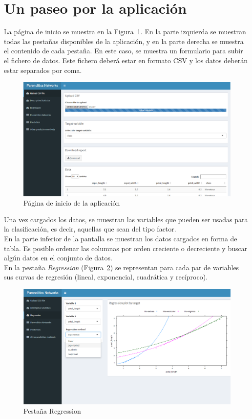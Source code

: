 \section{Un paseo por la aplicación}

La página de inicio se muestra en la Figura~\ref{fig:inicio}. En la parte izquierda se muestran todas las pestañas disponibles de la aplicación, y en la parte derecha se muestra el contenido de cada pestaña. En este caso, se muestra un formulario para subir el fichero de datos. Este fichero deberá estar en formato CSV y los datos deberán estar separados por coma.\\

\begin{figure}[tbph!]
	\centering
	\includegraphics[width=0.7\linewidth]{imagenes/inicio}
	\caption{Página de inicio de la aplicación}
	\label{fig:inicio}
\end{figure}

Una vez cargados los datos, se muestran las variables que pueden ser usadas para la clasificación, es decir, aquellas que sean del tipo factor.\\

En la parte inferior de la pantalla se muestran los datos cargados en forma de tabla. Es posible ordenar las columnas por orden creciente o decreciente y buscar algún datos en el conjunto de datos.\\

En la pestaña \textit{Regression} (Figura~\ref{fig:regresion}) se representan para cada par de variables sus curvas de regresión (lineal, exponencial, cuadrática y recíproco). 

\begin{figure}[tbph!]
	\centering
	\includegraphics[width=0.7\linewidth]{imagenes/regresion}
	\caption{Pestaña Regression}
	\label{fig:regresion}
\end{figure}

